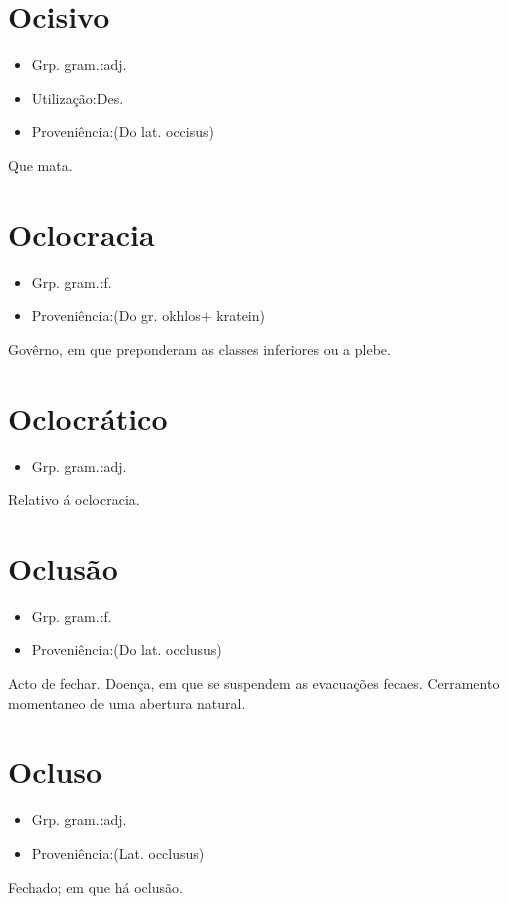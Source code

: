 \section{Ocisivo}
\begin{itemize}
\item {Grp. gram.:adj.}
\end{itemize}
\begin{itemize}
\item {Utilização:Des.}
\end{itemize}
\begin{itemize}
\item {Proveniência:(Do lat. \textunderscore occisus\textunderscore )}
\end{itemize}
Que mata.
\section{Oclocracia}
\begin{itemize}
\item {Grp. gram.:f.}
\end{itemize}
\begin{itemize}
\item {Proveniência:(Do gr. \textunderscore okhlos\textunderscore  + \textunderscore kratein\textunderscore )}
\end{itemize}
Govêrno, em que preponderam as classes inferiores ou a plebe.
\section{Oclocrático}
\begin{itemize}
\item {Grp. gram.:adj.}
\end{itemize}
Relativo á oclocracia.
\section{Oclusão}
\begin{itemize}
\item {Grp. gram.:f.}
\end{itemize}
\begin{itemize}
\item {Proveniência:(Do lat. \textunderscore occlusus\textunderscore )}
\end{itemize}
Acto de fechar.
Doença, em que se suspendem as evacuações fecaes.
Cerramento momentaneo de uma abertura natural.
\section{Ocluso}
\begin{itemize}
\item {Grp. gram.:adj.}
\end{itemize}
\begin{itemize}
\item {Proveniência:(Lat. \textunderscore occlusus\textunderscore )}
\end{itemize}
Fechado; em que há oclusão.
